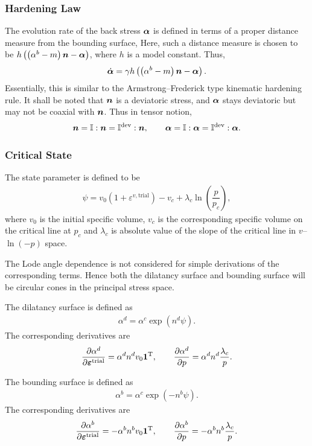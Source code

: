 \subsubsection{Hardening Law}
The evolution rate of the back stress $\bm{\alpha}$ is defined in terms of a proper distance measure from the bounding surface, Here, such a distance measure is chosen to be $h\left(\left(\alpha^b-m\right)\bm{n}-\bm{\alpha}\right)$, where $h$ is a model constant. Thus,
\begin{gather*}
\dot{\bm{\alpha}}=\gamma{}h\left(\left(\alpha^b-m\right)\bm{n}-\bm{\alpha}\right).
\end{gather*}
Essentially, this is similar to the Armstrong--Frederick type kinematic hardening rule. It shall be noted that $\bm{n}$ is a deviatoric stress, and $\bm{\alpha}$ stays deviatoric but may not be coaxial with $\bm{n}$. Thus in tensor notion,
\begin{gather}
\bm{n}=\mathbb{I}:\bm{n}=\mathbb{I}^\text{dev}:\bm{n},\qquad
\bm{\alpha}=\mathbb{I}:\bm{\alpha}=\mathbb{I}^\text{dev}:\bm{\alpha}.
\end{gather}
\subsubsection{Critical State}
The state parameter is defined to be
\begin{gather*}
\psi=v_0\left(1+\varepsilon^{v,\text{trial}}\right)-v_c+\lambda_c\ln\left(\dfrac{p}{p_c}\right),
\end{gather*}
where $v_0$ is the initial specific volume, $v_c$ is the corresponding specific volume on the critical line at $p_c$ and $\lambda_c$ is absolute value of the slope of the critical line in $v$--$\ln(-p)$ space.

The Lode angle dependence is not considered for simple derivations of the corresponding terms. Hence both the dilatancy surface and bounding surface will be circular cones in the principal stress space.

The dilatancy surface is defined as
\begin{gather*}
\alpha^d=\alpha^c\exp\left(n^d\psi\right).
\end{gather*}
The corresponding derivatives are
\begin{gather*}
\dfrac{\partial{\alpha^d}}{\partial{\bm{\varepsilon}^\text{trial}}}=\alpha^dn^dv_0\bm{1}^{\mathrm{T}},\qquad
\dfrac{\partial{\alpha^d}}{\partial{p}}=\alpha^dn^d\dfrac{\lambda_c}{p}.
\end{gather*}

The bounding surface is defined as
\begin{gather*}
\alpha^b=\alpha^c\exp\left(-n^b\psi\right).
\end{gather*}
The corresponding derivatives are
\begin{gather*}
\dfrac{\partial{\alpha^b}}{\partial{\bm{\varepsilon}^\text{trial}}}=-\alpha^bn^bv_0\bm{1}^{\mathrm{T}},\qquad
\dfrac{\partial{\alpha^b}}{\partial{p}}=-\alpha^bn^b\dfrac{\lambda_c}{p}.
\end{gather*}

